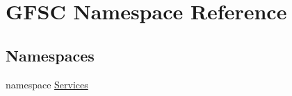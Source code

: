 \hypertarget{namespace_g_f_s_c}{}\section{G\+F\+SC Namespace Reference}
\label{namespace_g_f_s_c}
\subsection*{Namespaces}
\begin{DoxyCompactItemize}
\item 
namespace \mbox{\hyperlink{namespace_g_f_s_c_1_1_services}{Services}}
\end{DoxyCompactItemize}
